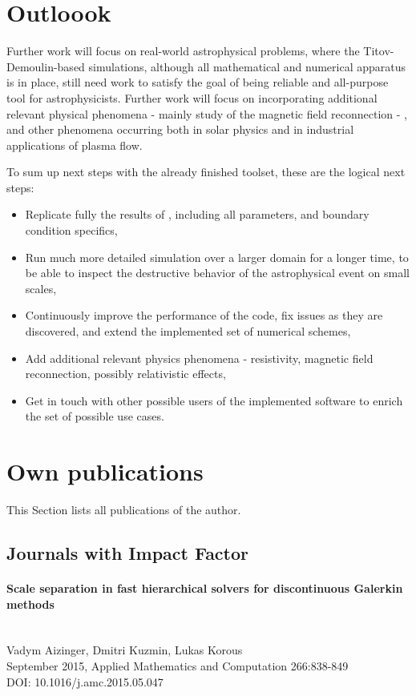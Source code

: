 \section{Outloook}
Further work will focus on real-world astrophysical problems, where the Titov-Demoulin-based simulations, although all mathematical and numerical apparatus is in place, still need work to satisfy the goal of being reliable and all-purpose tool for astrophysicists. Further work will focus on incorporating additional relevant physical phenomena - mainly study of the magnetic field reconnection - \citep{reconnection}, and other phenomena occurring both in solar physics and in industrial applications of plasma flow.

To sum up next steps with the already finished toolset, these are the logical next steps:
\begin{itemize}
\item Replicate fully the results of \cite{miraClanek}, including all parameters, and boundary condition specifics,
\item Run much more detailed simulation over a larger domain for a longer time, to be able to inspect the destructive behavior of the astrophysical event on small scales,
\item Continuously improve the performance of the code, fix issues as they are discovered, and extend the implemented set of numerical schemes,
\item Add additional relevant physics phenomena - resistivity, magnetic field reconnection, possibly relativistic effects,
\item Get in touch with other possible users of the implemented software to enrich the set of possible use cases.
\end{itemize}

\section*{Own publications}
This Section lists all publications of the author.
\subsection*{Journals with Impact Factor}
\paragraph{Scale separation in fast hierarchical solvers for discontinuous Galerkin methods}\ \\
Vadym Aizinger, Dmitri Kuzmin, Lukas Korous\\
September 2015, Applied Mathematics and Computation 266:838-849\\
DOI: 10.1016/j.amc.2015.05.047\\

